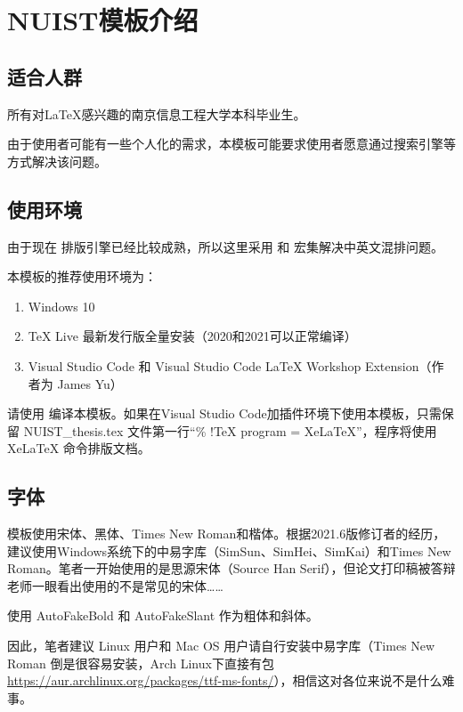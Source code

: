 \section{NUIST模板介绍}

\subsection{适合人群}

所有对\LaTeX 感兴趣的南京信息工程大学本科毕业生。

由于使用者可能有一些个人化的需求，本模板可能要求使用者愿意通过搜索引擎等方式解决该问题。

\subsection{使用环境}

由于现在 \XeTeX 排版引擎已经比较成熟，所以这里采用 \XeLaTeX{} 和 \CTeX{} 宏集解决中英文混排问题。

本模板的推荐使用环境为：

\begin{enumerate}[1、]
    \item Windows 10
    \item TeX Live 最新发行版全量安装（2020和2021可以正常编译）
    \item Visual Studio Code 和 Visual Studio Code LaTeX Workshop Extension（作者为 James Yu）
\end{enumerate}

请使用\XeLaTeX{} 编译本模板。如果在Visual Studio Code加插件环境下使用本模板，只需保留 NUIST\_thesis.tex 文件第一行“\% !TeX program  = XeLaTeX”，程序将使用XeLaTeX 命令排版文档。

\subsection{字体}

模板使用宋体、黑体、Times New Roman和楷体。根据2021.6版修订者的经历，建议使用Windows系统下的中易字库（SimSun、SimHei、SimKai）和Times New Roman。笔者一开始使用的是思源宋体（Source Han Serif），但论文打印稿被答辩老师一眼看出使用的不是常见的宋体……

使用 AutoFakeBold 和 AutoFakeSlant 作为粗体和斜体。

因此，笔者建议 Linux 用户和 Mac OS 用户请自行安装中易字库（Times New Roman 倒是很容易安装，Arch Linux下直接有包 \url{https://aur.archlinux.org/packages/ttf-ms-fonts/}），相信这对各位来说不是什么难事。

